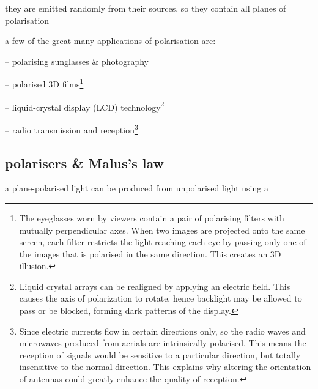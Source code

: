 they are emitted randomly from their sources, so they contain all planes of polarisation


\cmt a few of the great many applications of polarisation are:

\begin{compactitem}
	\item[--] polarising sunglasses \& photography 
	
	\item[--] polarised 3D films\footnote[][-6.5cm]{The eyeglasses worn by viewers contain a pair of polarising filters with mutually perpendicular axes. When two images are projected onto the same screen, each filter restricts the light reaching each eye by passing only one of the images that is polarised in the same direction. This creates an 3D illusion.}
	
	\item[--] liquid-crystal display (LCD) technology\footnote[][-4cm]{Liquid crystal arrays can be realigned by applying an electric field. This causes the axis of polarization to rotate, hence backlight may be allowed to pass or be blocked, forming dark patterns of the display.}
	
	\item[--] radio transmission and reception\footnote[][-2cm]{Since electric currents flow in certain directions only, so the radio waves and microwaves produced from aerials are intrinsically polarised. This means the reception of signals would be sensitive to a particular direction, but totally insensitive to the normal direction. This explains why altering the orientation of antennas could greatly enhance the quality of reception.}
\end{compactitem}

\subsection{polarisers \& Malus's law}

a plane-polarised light can be produced from unpolarised light using a 

